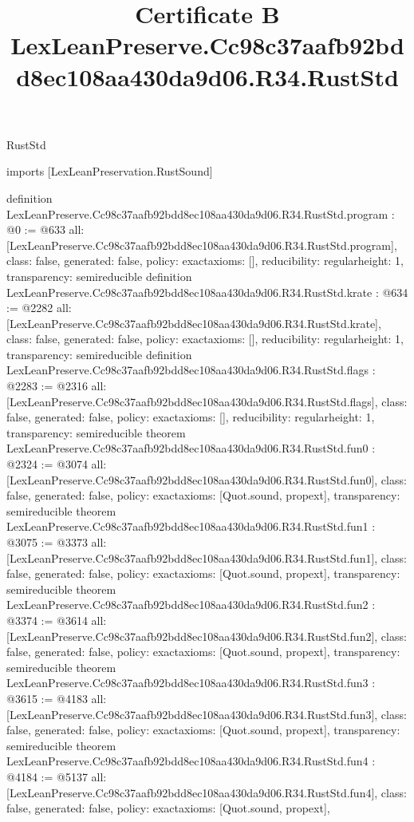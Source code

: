 \begin{lexlean}{RustStd}
\title{Certificate B LexLeanPreserve.Cc98c37aafb92bdd8ec108aa430da9d06.R34.RustStd}
\begin{coremodule}
imports [LexLeanPreservation.RustSound]

definition LexLeanPreserve.Cc98c37aafb92bdd8ec108aa430da9d06.R34.RustStd.program : @0 := @633 {
  all: [LexLeanPreserve.Cc98c37aafb92bdd8ec108aa430da9d06.R34.RustStd.program],
  class: false,
  generated: false,
  policy: exact{axioms: []},
  reducibility: regular{height: 1},
  transparency: semireducible
}
definition LexLeanPreserve.Cc98c37aafb92bdd8ec108aa430da9d06.R34.RustStd.krate : @634 := @2282 {
  all: [LexLeanPreserve.Cc98c37aafb92bdd8ec108aa430da9d06.R34.RustStd.krate],
  class: false,
  generated: false,
  policy: exact{axioms: []},
  reducibility: regular{height: 1},
  transparency: semireducible
}
definition LexLeanPreserve.Cc98c37aafb92bdd8ec108aa430da9d06.R34.RustStd.flags : @2283 := @2316 {
  all: [LexLeanPreserve.Cc98c37aafb92bdd8ec108aa430da9d06.R34.RustStd.flags],
  class: false,
  generated: false,
  policy: exact{axioms: []},
  reducibility: regular{height: 1},
  transparency: semireducible
}
theorem LexLeanPreserve.Cc98c37aafb92bdd8ec108aa430da9d06.R34.RustStd.fun0 : @2324 := @3074 {
  all: [LexLeanPreserve.Cc98c37aafb92bdd8ec108aa430da9d06.R34.RustStd.fun0],
  class: false,
  generated: false,
  policy: exact{axioms: [Quot.sound, propext]},
  transparency: semireducible
}
theorem LexLeanPreserve.Cc98c37aafb92bdd8ec108aa430da9d06.R34.RustStd.fun1 : @3075 := @3373 {
  all: [LexLeanPreserve.Cc98c37aafb92bdd8ec108aa430da9d06.R34.RustStd.fun1],
  class: false,
  generated: false,
  policy: exact{axioms: [Quot.sound, propext]},
  transparency: semireducible
}
theorem LexLeanPreserve.Cc98c37aafb92bdd8ec108aa430da9d06.R34.RustStd.fun2 : @3374 := @3614 {
  all: [LexLeanPreserve.Cc98c37aafb92bdd8ec108aa430da9d06.R34.RustStd.fun2],
  class: false,
  generated: false,
  policy: exact{axioms: [Quot.sound, propext]},
  transparency: semireducible
}
theorem LexLeanPreserve.Cc98c37aafb92bdd8ec108aa430da9d06.R34.RustStd.fun3 : @3615 := @4183 {
  all: [LexLeanPreserve.Cc98c37aafb92bdd8ec108aa430da9d06.R34.RustStd.fun3],
  class: false,
  generated: false,
  policy: exact{axioms: [Quot.sound, propext]},
  transparency: semireducible
}
theorem LexLeanPreserve.Cc98c37aafb92bdd8ec108aa430da9d06.R34.RustStd.fun4 : @4184 := @5137 {
  all: [LexLeanPreserve.Cc98c37aafb92bdd8ec108aa430da9d06.R34.RustStd.fun4],
  class: false,
  generated: false,
  policy: exact{axioms: [Quot.sound, propext]},
}
\end{coremodule}
\end{lexlean}

